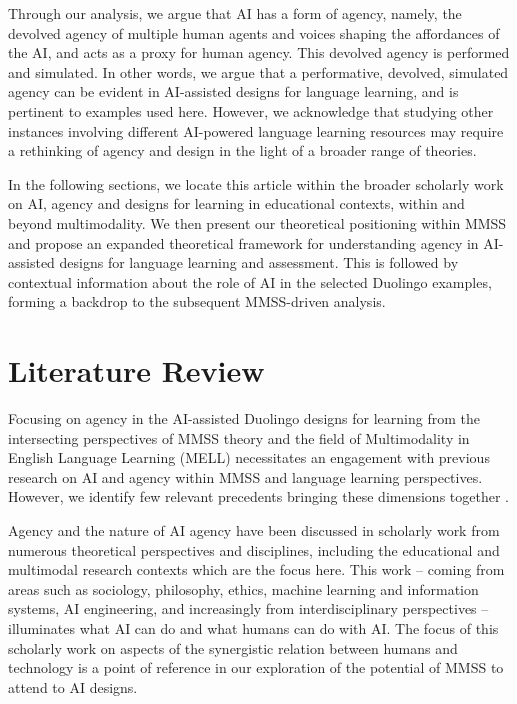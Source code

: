 \documentclass[english]{textolivre}
\begin{document}
Through our analysis, we argue that AI has a form of agency, namely, the devolved agency of multiple human agents and voices shaping the affordances of the AI, and acts as a proxy for human agency. This devolved agency is performed and simulated. In other words, we argue that a performative, devolved, simulated agency can be evident in AI-assisted designs for language learning, and is pertinent to examples used here. However, we acknowledge that studying other instances involving different AI-powered language learning resources may require a rethinking of agency and design in the light of a broader range of theories.

In the following sections, we locate this article within the broader scholarly work on AI, agency and designs for learning in educational contexts, within and beyond multimodality. We then present our theoretical positioning within MMSS and propose an expanded theoretical framework for understanding agency in AI-assisted designs for language learning and assessment. This is followed by contextual information about the role of AI in the selected Duolingo examples, forming a backdrop to the subsequent MMSS-driven analysis.

\section{Literature Review}\label{sec-normas}
Focusing on agency in the AI-assisted Duolingo designs for learning from the intersecting perspectives of MMSS theory and the field of Multimodality in English Language Learning (MELL) \cite{diamantopoulou2025mell} necessitates an engagement with previous research on AI and agency within MMSS and language learning perspectives. However, we identify few relevant precedents bringing these dimensions together \cite{vondavier2025designing}.

Agency and the nature of AI agency have been discussed in scholarly work from numerous theoretical perspectives and disciplines, including the educational and multimodal research contexts which are the focus here. This work – coming from areas such as sociology, philosophy, ethics, machine learning and information systems, AI engineering, and increasingly from interdisciplinary perspectives – illuminates what AI can do and what humans can do with AI. The focus of this scholarly work on aspects of the synergistic relation between humans and technology is a point of reference in our exploration of the potential of MMSS to attend to AI designs.
\end{document}
